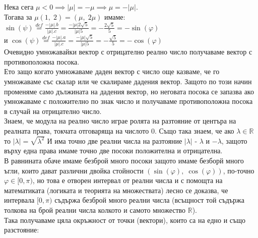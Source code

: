 \documentclass[12pt]{article}
\newcommand{\R}{\mathbb{R}}
\begin{document}
Нека сега $\mu < 0 \implies |\mu| = -\mu \implies \mu = -|\mu| $. \\
Тогава за $\mu(1, \; 2) = (\mu, \; 2\mu) $ имаме: \\
$ \sin(\psi) \overset{def}{=} \frac{-|\mu|.b}{|\mu|.c} = \frac{-|\mu|2\sqrt{5}}{|\mu|5} = -\frac{2\sqrt{5}}{5} = -\sin(\varphi) $ \\
и $ \cos(\psi) \overset{def}{=} \frac{-|\mu|.a}{|\mu|.c} = \frac{-|\mu|\sqrt{5}}{|\mu|5} = -\frac{\sqrt{5}}{5} = -\cos(\varphi) $ \\

Очевидно умножавайки вектор с отрицателно реално число получаваме вектор с противоположна посока. \\

Ето защо когато умножаваме даден вектор с число още казваме, че го умножаваме със скалар или че скалираме дадения вектор.
Защото по този начин променяме само дължината на дадения вектор, но неговата посока се запазва ако умножаваме с положително по знак число и
получаваме противоположна посока в случай на отрицателно число. \\

Знаем, че модула на реално число играе ролята на разтояние от центъра на реалната права, токчата отговаряща на числото $0$.
Също така знаем, че ако $\lambda \in \R$ то $|\lambda| = \sqrt{\lambda^2}$ И има точно две реални числа на разтояние
$|\lambda|$ - $\lambda$ и $-\lambda$, защото върху една права имаме точно две посоки положителна и отрицателна. \\

В равнината обаче имаме безброй много посоки защото имаме безборй много ъгли, които дават различни двойка стойности $(\sin(\varphi), \; \cos(\varphi))$,
по-точно $\varphi \in [0, \pi)$, но това е отворен интервал от реални числа и с помощта на математиката (логиката и теорията на множествата) лесно
се доказва, че интервала $[0, \pi)$ съдържа безброй много реални числа (всъщност той съдържа толкова на брой реални числа колкото и самото множество $\R$). \\

Така получаваме цяла окръжност от точки (вектори), които са на едно и също разстояние: \\

\end{document}
